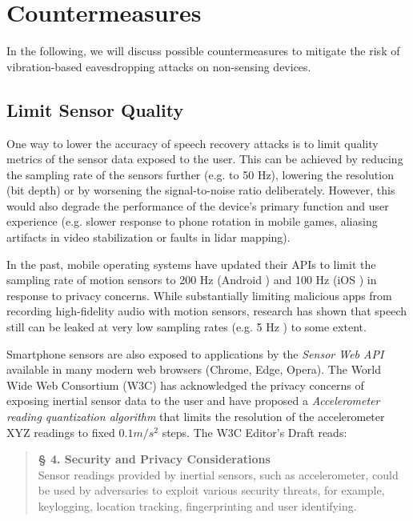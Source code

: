 \documentclass[sigconf, nonacm]{acmart}
\begin{document}
\section{Countermeasures}
In the following, we will discuss possible countermeasures to mitigate the risk of vibration-based eavesdropping attacks on non-sensing devices.

\subsection{Limit Sensor Quality}
One way to lower the accuracy of speech recovery attacks is to limit quality metrics of the sensor data exposed to the user.
This can be achieved by reducing the sampling rate of the sensors further (e.g. to 50 Hz), lowering the resolution (bit depth) or by worsening the signal-to-noise ratio deliberately.
However, this would also degrade the performance of the device's primary function and user experience (e.g. slower response to phone rotation in mobile games, aliasing artifacts in video stabilization or faults in lidar mapping).

In the past, mobile operating systems have updated their APIs to limit the sampling rate of motion sensors to 200 Hz (Android \cite{AndroidDeveloperSensorDocs}) and 100 Hz (iOS \cite{AppleDeveloperAccelerometerData}\cite{AppleDeveloperGyroscopeData}) in response to privacy concerns.
While substantially limiting malicious apps from recording high-fidelity audio with motion sensors, research has shown that speech still can be leaked at very low sampling rates (e.g. 5 Hz \cite{WatchTheRhythm2024}) to some extent.

Smartphone sensors are also exposed to applications by the \textit{Sensor Web API} \cite{MDNWebDocsSensorAPI} available in many modern web browsers (Chrome, Edge, Opera).
The World Wide Web Consortium (W3C) has acknowledged the privacy concerns of exposing inertial sensor data to the user and have proposed a \textit{Accelerometer reading quantization algorithm} \cite{W3CAccelerometerQuantization} that limits the resolution of the accelerometer XYZ readings to fixed $0.1 m/s^2$ steps.
The W3C Editor's Draft reads:
\begin{quote}
  \vspace{0.1cm}
  \textbf{§ 4. Security and Privacy Considerations} \\
  Sensor readings provided by inertial sensors, such as accelerometer, could be used by adversaries to exploit various security threats, for example, keylogging, location tracking, fingerprinting and user identifying.
\end{quote}
\end{document}
